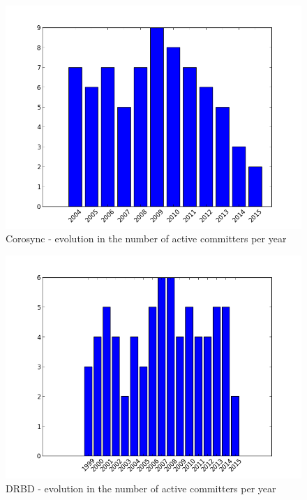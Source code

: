 \documentclass[a4paper, 12pt]{book}
\begin{document}
    \begin{figure}[H]
      \centering
      \includegraphics[scale=0.45]{barchart_c.png}
      \caption[Active committers for Corosync]{Corosync - evolution in the number of active committers per year}
      \label{fig:barchart_c}
    \end{figure}
	  
    \begin{figure}[H]
      \centering
      \includegraphics[scale=0.45]{barchart_d.png}
      \caption[Active committers for DRBD]{DRBD - evolution in the number of active committers per year}
      \label{fig:barchart_d}
    \end{figure}
    
\end{document}
